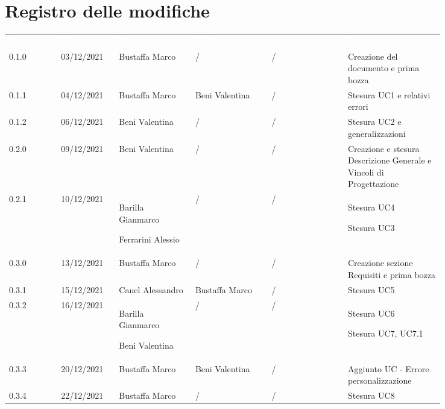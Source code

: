 \section*{Registro delle modifiche}

{\renewcommand{\arraystretch}{1.5}
\scriptsize
\begin{tabular}{p{0.10\linewidth}p{0.10\linewidth}p{0.15\linewidth}p{0.15\linewidth}p{0.15\linewidth}p{0.19\linewidth}}
	\rowcolor[RGB]{33, 73, 50}
	\textcolor{white}{\textbf{Versione}} & \textcolor{white}{\textbf{Data}} & 
	\textcolor{white}{\textbf{Redattore}} & \textcolor{white}{\textbf{Verificatore}} & 
	\textcolor{white}{\textbf{Approvatore}} & \textcolor{white}{\textbf{Descrizione}}\\
	\rowcolor[RGB]{216, 235, 171}
	0.1.0 & 03/12/2021 & Bustaffa Marco& / &/& Creazione del documento e prima bozza\\
	\rowcolor[RGB]{233, 245, 206}
	0.1.1 & 04/12/2021 & Bustaffa Marco& Beni Valentina &/& Stesura UC1 e relativi errori\\
	\rowcolor[RGB]{216, 235, 171}
	0.1.2 & 06/12/2021 & Beni Valentina& / &/& Stesura UC2 e generalizzazioni\\
	\rowcolor[RGB]{233, 245, 206}
	0.2.0 & 09/12/2021 & Beni Valentina& / &/& Creazione e stesura Descrizione Generale e Vincoli di Progettazione\\
	\rowcolor[RGB]{216, 235, 171}
	0.2.1 & 10/12/2021 & Barilla Gianmarco \par Ferrarini Alessio& / &/& Stesura UC4 \par Stesura UC3 \\
	\rowcolor[RGB]{233, 245, 206}
	0.3.0 & 13/12/2021 & Bustaffa Marco& / &/& Creazione sezione Requisiti e prima bozza\\
	\rowcolor[RGB]{216, 235, 171}
	0.3.1 & 15/12/2021 & Canel Alessandro& Bustaffa Marco &/& Stesura UC5\\
	\rowcolor[RGB]{233, 245, 206}
	0.3.2 & 16/12/2021 & Barilla Gianmarco \par Beni Valentina& / &/& Stesura UC6 \par Stesura UC7, UC7.1\\
	\rowcolor[RGB]{216, 235, 171}
	0.3.3 & 20/12/2021 & Bustaffa Marco& Beni Valentina &/& Aggiunto UC - Errore personalizzazione\\
	\rowcolor[RGB]{233, 245, 206}
	0.3.4 & 22/12/2021 & Bustaffa Marco& / &/& Stesura UC8\\
\end{tabular}	
}